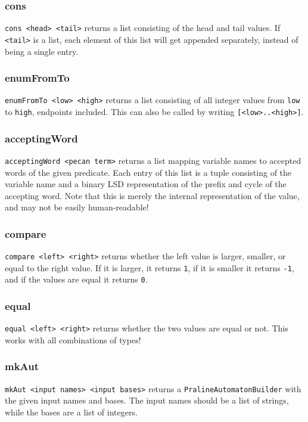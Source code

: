 \documentclass{report}
\begin{document}
\subsubsection{cons}
\verb+cons <head> <tail>+ returns a list consisting of the head and tail values.
If \verb+<tail>+ is a list, each element of this list will get appended separately, instead of being a single entry.

\subsubsection{enumFromTo}
\verb+enumFromTo <low> <high>+ returns a list consisting of all integer values from \verb+low+ to \verb+high+, endpoints included.
This can also be called by writing \verb+[<low>..<high>]+.

\subsubsection{acceptingWord}
\verb+acceptingWord <pecan term>+ returns a list mapping variable names to accepted words of the given predicate.
Each entry of this list is a tuple consisting of the variable name and a binary LSD representation of the prefix and cycle of the accepting word.
Note that this is merely the internal representation of the value, and may not be easily human-readable!

\subsubsection{compare}
\verb+compare <left> <right>+ returns whether the left value is larger, smaller, or equal to the right value.
If it is larger, it returns \verb+1+, if it is smaller it returns \verb+-1+, and if the values are equal it returns \verb+0+.

\subsubsection{equal}
\verb+equal <left> <right>+ returns whether the two values are equal or not.
This works with all combinations of types!

\subsubsection{mkAut}
\verb+mkAut <input names> <input bases>+ returns a \verb+PralineAutomatonBuilder+ with the given input names and bases.
The input names should be a list of strings, while the bases are a list of integers.
\end{document}

